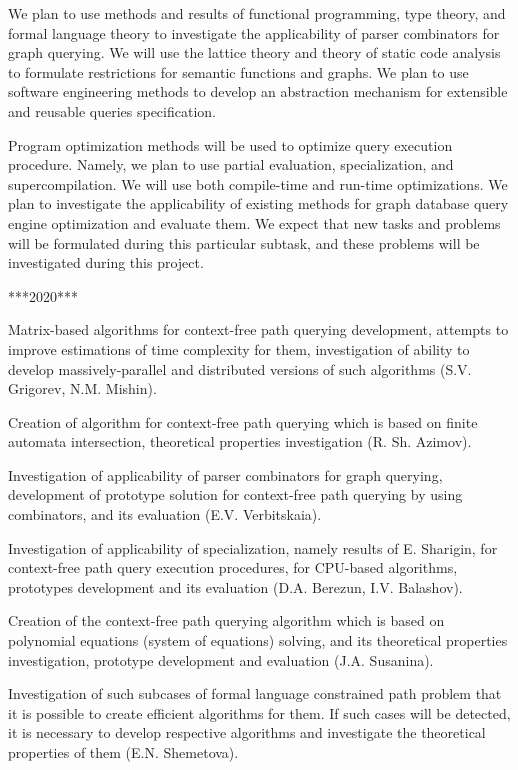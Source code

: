 \documentclass[12pt]{article}  %
\theoremstyle{remark}
\begin{document}
We plan to use methods and results of functional programming, type theory, and formal language theory to investigate the applicability of parser combinators for graph querying.
We will use the lattice theory and theory of static code analysis to formulate restrictions for semantic functions and graphs.
We plan to use software engineering methods to develop an abstraction mechanism for extensible and reusable queries specification.

Program optimization methods will be used to optimize query execution procedure. Namely, we plan to use partial evaluation, specialization, and supercompilation. We will use both compile-time and run-time optimizations. We plan to investigate the applicability of existing methods for graph database query engine optimization and evaluate them. We expect that new tasks and problems will be formulated during this particular subtask, and these problems will be investigated during this project.

***2020***

Matrix-based algorithms for context-free path querying development, attempts to improve estimations of time complexity for them, investigation of ability to develop massively-parallel and distributed versions of such algorithms (S.V. Grigorev, N.M. Mishin).

Creation of algorithm for context-free path querying which is based on finite automata intersection, theoretical properties investigation (R. Sh. Azimov).

Investigation of applicability of parser combinators for graph querying, development of prototype solution for context-free path querying by using combinators, and its evaluation (E.V. Verbitskaia).

Investigation of applicability of specialization, namely results of E. Sharigin, for context-free path query execution procedures, for CPU-based algorithms, prototypes development and its evaluation (D.A. Berezun, I.V. Balashov).

Creation of the context-free path querying algorithm which is based on polynomial equations (system of equations) solving, and its theoretical properties investigation, prototype development and evaluation (J.A. Susanina).

Investigation of such subcases of formal language constrained path problem that it is possible to create efficient algorithms for them. If such cases will be detected, it is necessary to develop respective algorithms and investigate the theoretical properties of them (E.N. Shemetova).
\end{document}
